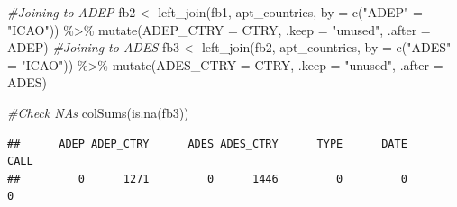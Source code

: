 \documentclass[conference,final,]{IEEEtran}
\newenvironment{Shaded}{\begin{snugshade}}{\end{snugshade}}
\newcommand{\AttributeTok}[1]{\textcolor[rgb]{0.77,0.63,0.00}{#1}}
\newcommand{\CommentTok}[1]{\textcolor[rgb]{0.56,0.35,0.01}{\textit{#1}}}
\newcommand{\FunctionTok}[1]{\textcolor[rgb]{0.00,0.00,0.00}{#1}}
\newcommand{\NormalTok}[1]{#1}
\newcommand{\OtherTok}[1]{\textcolor[rgb]{0.56,0.35,0.01}{#1}}
\newcommand{\SpecialCharTok}[1]{\textcolor[rgb]{0.00,0.00,0.00}{#1}}
\newcommand{\StringTok}[1]{\textcolor[rgb]{0.31,0.60,0.02}{#1}}
\begin{document}
\begin{Shaded}
\begin{Highlighting}[]
\CommentTok{\#Joining to ADEP}
\NormalTok{fb2 }\OtherTok{\textless{}{-}} \FunctionTok{left\_join}\NormalTok{(fb1, apt\_countries, }\AttributeTok{by =} \FunctionTok{c}\NormalTok{(}\StringTok{"ADEP"} \OtherTok{=} \StringTok{"ICAO"}\NormalTok{)) }\SpecialCharTok{\%\textgreater{}\%} \FunctionTok{mutate}\NormalTok{(}\AttributeTok{ADEP\_CTRY =}\NormalTok{ CTRY, }\AttributeTok{.keep =} \StringTok{"unused"}\NormalTok{, }\AttributeTok{.after =}\NormalTok{ ADEP)}
\CommentTok{\#Joining to ADES}
\NormalTok{fb3 }\OtherTok{\textless{}{-}} \FunctionTok{left\_join}\NormalTok{(fb2, apt\_countries, }\AttributeTok{by =} \FunctionTok{c}\NormalTok{(}\StringTok{"ADES"} \OtherTok{=} \StringTok{"ICAO"}\NormalTok{)) }\SpecialCharTok{\%\textgreater{}\%} \FunctionTok{mutate}\NormalTok{(}\AttributeTok{ADES\_CTRY =}\NormalTok{ CTRY, }\AttributeTok{.keep =} \StringTok{"unused"}\NormalTok{, }\AttributeTok{.after =}\NormalTok{ ADES)}

\CommentTok{\#Check  NA\textquotesingle{}s}
\FunctionTok{colSums}\NormalTok{(}\FunctionTok{is.na}\NormalTok{(fb3))}
\end{Highlighting}
\end{Shaded}

\begin{verbatim}
##      ADEP ADEP_CTRY      ADES ADES_CTRY      TYPE      DATE      CALL 
##         0      1271         0      1446         0         0         0
\end{verbatim}
\end{document}
